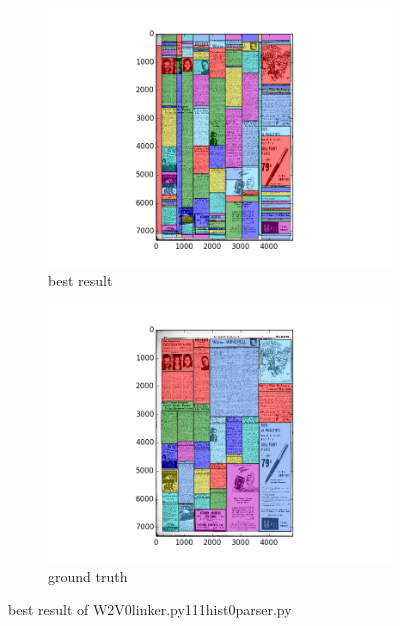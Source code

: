 \documentclass[a4paper,10pt]{article}
\begin{document}
					\begin{figure}
					\centering
					\begin{subfigure}{.5\textwidth}
					  \centering
					  \includegraphics[width=10cm]
					{W2V0linker.py111hist0parser.py.best.png}
					  \caption{best result}
					  \label{fig:sub1}
					\end{subfigure}%
					\begin{subfigure}{.5\textwidth}
					  \centering
					  \includegraphics[width=10cm]
					{W2V0linker.py111hist0parser.py.gt.best.png}
					  \caption{ground truth}
					  \label{fig:sub2}
					\end{subfigure}
					\caption
					{best result of W2V0linker.py111hist0parser.py}
					\label{fig:test}
					\end{figure}
					
\end{document}
